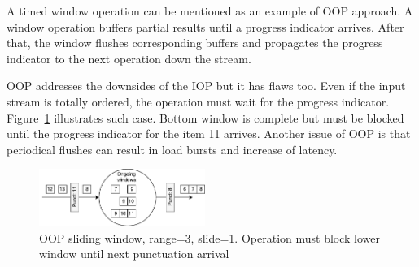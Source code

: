 A timed window operation can be mentioned as an example of OOP approach. A window operation buffers partial results until a progress indicator arrives. After that, the window flushes corresponding buffers and propagates the progress indicator to the next operation down the stream.

OOP addresses the downsides of the IOP but it has flaws too. Even if the input stream is totally ordered, the operation must wait for the progress indicator. Figure~\ref{oop} illustrates such case. Bottom window is complete but must be blocked until the progress indicator for the item 11 arrives. Another issue of OOP is that periodical flushes can result in load bursts and increase of latency. 

\begin{figure}[htbp]
  \centering
  \includegraphics[width=0.48\textwidth]{pics/oop}
  \caption{OOP sliding window, range=3, slide=1. Operation must block lower window until next punctuation arrival }
  \label {oop}
\end{figure}
